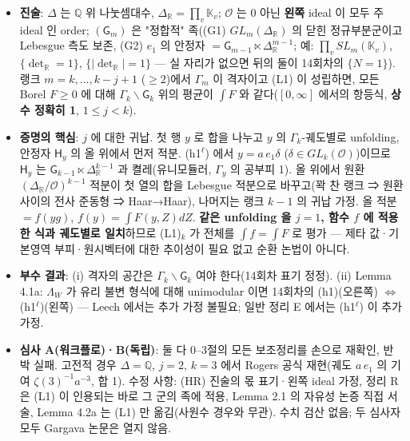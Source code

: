 \begin{itemize}
\tightlist
\item
  \textbf{진술}: \(\Delta\) 는 \(\mathbb Q\) 위 나눗셈대수, \(\Delta_\mathbb R=\prod_v\mathbb K_v\); \(\mathcal O\) 는 0 아닌 \textbf{왼쪽} ideal 이 모두 주 ideal 인 order; \((\mathsf G_m)\) 은 "정합적" 족((G1) \(GL_m(\Delta_\mathbb R)\) 의 닫힌 정규부분군이고 Lebesgue 측도 보존, (G2) \(e_1\) 의 안정자 \(=\mathsf G_{m-1}\ltimes\Delta_\mathbb R^{m-1}\); 예: \(\prod_vSL_m(\mathbb K_v)\), \(\{\det_\mathbb R=1\}\), \(\{|\det_\mathbb R|=1\}\) --- 실 자리가 없으면 뒤의 둘이 14회차의 \(\{N=1\}\)). 랭크 \(m=k,\dots,k-j+1\) (\(\ge2\))에서 \(\Gamma_m\) 이 격자이고 (L1) 이 성립하면, 모든 Borel \(F\ge0\) 에 대해 \(\Gamma_k\backslash\mathsf G_k\) 위의 평균이 \(\int F\) 와 같다(\([0,\infty]\) 에서의 항등식, \textbf{상수 정확히 1}, \(1\le j<k\)).
\item
  \textbf{증명의 핵심}: \(j\) 에 대한 귀납. 첫 행 \(y\) 로 합을 나누고 \(y\) 의 \(\Gamma_k\)-궤도별로 unfolding, 안정자 \(\mathsf H_y\) 의 올 위에서 먼저 적분. (h1\(^\ell\)) 에서 \(y=a\,e_1\delta\) (\(\delta\in GL_k(\mathcal O)\))이므로 \(\mathsf H_y\) 는 \(\mathsf G_{k-1}\ltimes\Delta_\mathbb R^{k-1}\) 과 켤레(유니모듈러, \(\Gamma_y\) 의 공부피 1). 올 위에서 원환 \((\Delta_\mathbb R/\mathcal O)^{k-1}\) 적분이 첫 열의 합을 Lebesgue 적분으로 바꾸고(꽉 찬 랭크 ⇒ 원환 사이의 전사 준동형 ⇒ Haar→Haar), 나머지는 랭크 \(k-1\) 의 귀납 가정. 올 적분 \(=f(yg)\), \(f(y)=\int F(y,Z)dZ\). \textbf{같은 unfolding 을 \(j=1\), 함수 \(f\) 에 적용한 식과 궤도별로 일치}하므로 (L1)\(_k\) 가 전체를 \(\int f=\int F\) 로 평가 --- 제타 값·기본영역 부피·원시벡터에 대한 추이성이 필요 없고 순환 논법이 아니다.
\item
  \textbf{부수 결과}: (i) 격자의 공간은 \(\Gamma_k\backslash\mathsf G_k\) 여야 한다(14회차 표기 정정). (ii) Lemma 4.1a: \(\Lambda_W\) 가 유리 불변 형식에 대해 unimodular 이면 14회차의 (h1)(오른쪽) \(\iff\) (h1\(^\ell\))(왼쪽) --- Leech 에서는 추가 가정 불필요; 일반 정리 E 에서는 (h1\(^\ell\)) 이 추가 가정.
\item
  \textbf{심사 A(워크플로)·B(독립)}: 둘 다 0--3절의 모든 보조정리를 손으로 재확인, 반박 실패. 고전적 경우 \(\Delta=\mathbb Q\), \(j=2\), \(k=3\) 에서 Rogers 공식 재현(궤도 \(a\,e_1\) 의 기여 \(\zeta(3)^{-1}a^{-3}\), 합 1). 수정 사항: (HR) 진술의 몫 표기·왼쪽 ideal 가정, 정리 R 은 (L1) 이 인용되는 바로 그 군의 족에 적용, Lemma 2.1 의 자유성 논증 직접 서술, Lemma 4.2a 는 (L1) 만 옮김(사원수 경우와 무관). 수치 검산 없음; 두 심사자 모두 Gargava 논문은 열지 않음.
\end{itemize}

